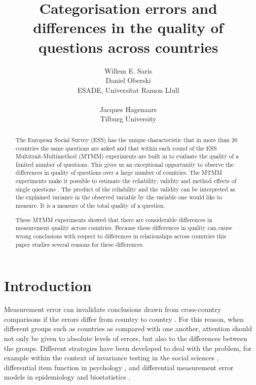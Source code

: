 \documentclass[a4paper,12pt]{article}
\author{Willem E. Saris\\Daniel Oberski\\ESADE, Universitat Ramon Llull\\\\Jacques Hagenaars\\Tilburg University}
\title{Categorisation errors and differences in the quality of questions across countries}
\begin{document}
\maketitle
\begin{abstract}
The European Social Survey (ESS) has the unique characteristic that in more than 20 countries the same questions are asked and that within each round of the ESS Multitrait-Multimethod (MTMM) experiments are built in to evaluate the quality of a limited number of questions. This gives us an exceptional opportunity to observe the differences in quality of questions over a large number of countries. The MTMM experiments make it possible to estimate the reliability, validity and method effects of single questions \cite{andrews_construct_1984,saris_new_2004,saris_evaluation_1991}. The product of the reliability and the validity can be interpreted as the explained variance in the observed variable by the variable one would like to measure. It is a measure of the total quality of a question.

These MTMM experiments showed that there are considerable differences in measurement quality across countries. Because these differences in quality can cause wrong conclusions with respect to differences in relationships across countries this paper studies several reasons for these differences.
\end{abstract}\newpage

\section*{Introduction}

Measurement error can invalidate conclusions drawn from cross-country comparisons if the errors differ from country to country \cite{Saris_design_2007}. For this reason, when different groups such as countries as compared with one another, attention should not only be given to absolute levels of errors, but also to the differences between the groups. Different strategies have been developed to deal with the problem, for example within the context of invariance testing in the social sciences \cite{joreskog_simultaneous_1971}, differential item function in psychology \cite{muthen_multiple_1985}, and differential measurement error models in epidemiology and biostatistics \cite{carroll_nonlinear_1995}.
\end{document}
